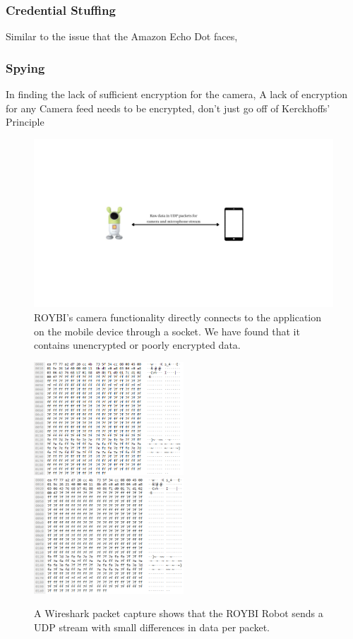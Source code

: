 \documentclass[12pt]{ucthesis}
\begin{document}
\subsubsection{Credential Stuffing}
Similar to the issue that the Amazon Echo Dot faces, 

\subsubsection{Spying}
In finding the lack of sufficient encryption for the camera, 
A lack of encryption for any 
Camera feed needs to be encrypted, don't just go off of Kerckhoffs' Principle \cite{kerckhoffs}


\begin{figure}
    \includegraphics[width=\textwidth]{udp.jpg}
    \caption{ROYBI's camera functionality directly connects to the application on the mobile device through a socket. We have found that it contains unencrypted or poorly encrypted data.}
    \label{fig:udp}
\end{figure}

\begin{figure}
    \includegraphics[width=0.5\textwidth]{unencrypted1.png}
    \includegraphics[width=0.5\textwidth]{unencrypted2.png}
    \caption{A Wireshark packet capture shows that the ROYBI Robot sends a UDP stream with small differences in data per packet.}
    \label{fig:unencrypted}
\end{figure}
\end{document}
